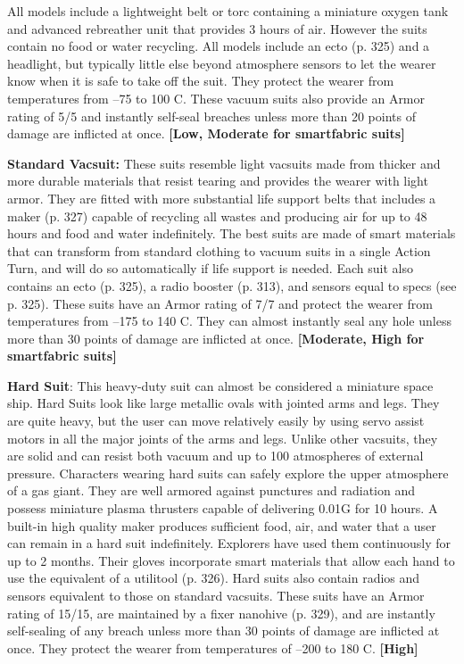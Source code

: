 All models include a lightweight belt or torc 
containing a miniature oxygen tank and advanced 
rebreather unit that provides 3 hours of air. However
the suits contain no food or water recycling. All
models include an ecto (p. 325) and a headlight, but 
typically little else beyond atmosphere sensors to let 
the wearer know when it is safe to take off the suit. 
They protect the wearer from temperatures from –75 
to 100 C. These vacuum suits also provide an Armor 
rating of 5/5 and instantly self-seal breaches unless 
more than 20 points of damage are inflicted at once. 
\textbf{[Low, Moderate for smartfabric suits]}

\textbf{Standard Vacsuit:} These suits resemble light vacsuits
made from thicker and more durable materials
that resist tearing and provides the wearer with light 
armor. They are fitted with more substantial life support
belts that includes a maker (p. 327) capable of
recycling all wastes and producing air for up to 48 
hours and food and water indefinitely. The best suits 
are made of smart materials that can transform from 
standard clothing to vacuum suits in a single Action 
Turn, and will do so automatically if life support is 
needed. Each suit also contains an ecto (p. 325), a 
radio booster (p. 313), and sensors equal to specs (see 
p. 325). These suits have an Armor rating of 7/7 and 
protect the wearer from temperatures from –175 to 
140 C. They can almost instantly seal any hole unless 
more than 30 points of damage are inflicted at once. 
\textbf{[Moderate, High for smartfabric suits]}

\textbf{Hard Suit}: This heavy-duty suit can almost be 
considered a miniature space ship. Hard Suits look 
like large metallic ovals with jointed arms and legs. 
They are quite heavy, but the user can move relatively 
easily by using servo assist motors in all the major 
joints of the arms and legs. Unlike other vacsuits, they 
are solid and can resist both vacuum and up to 100 
atmospheres of external pressure. Characters wearing 
hard suits can safely explore the upper atmosphere 
of a gas giant. They are well armored against punctures
and radiation and possess miniature plasma
thrusters capable of delivering 0.01G for 10 hours. A 
built-in high quality maker produces sufficient food, 
air, and water that a user can remain in a hard suit 
indefinitely. Explorers have used them continuously 
for up to 2 months. Their gloves incorporate smart 
materials that allow each hand to use the equivalent 
of a utilitool (p. 326). Hard suits also contain radios 
and sensors equivalent to those on standard vacsuits. 
These suits have an Armor rating of 15/15, are maintained
by a fixer nanohive (p. 329), and are instantly
self-sealing of any breach unless more than 30 points 
of damage are inflicted at once. They protect the 
wearer from temperatures of –200 to 180 C. \textbf{[High]}

